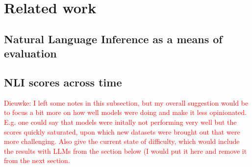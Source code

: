 \section{Related work}


\subsection{Natural Language Inference as a means of evaluation}
\label{related:benchmarks}


% 

\subsection{NLI scores across time}
\label{related:mlms}
\textcolor{red}{Dieuwke: I left some notes in this subsection, but my overall suggestion would be to focus a bit more on how well models were doing and make it less opinionated. E.g. one could say that models were initally not performing very well but the scores quickly saturated, upon which new datasets were brought out that were more challenging.
Also give the current state of difficulty, which would include the results with LLMs from the section below (I would put it here and remove it from the next section.}


